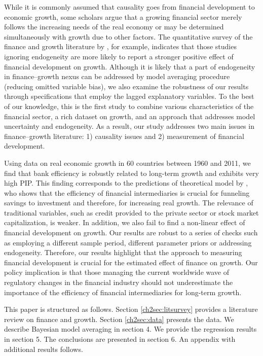 \begin{refsection}
While it is commonly assumed that causality goes from financial development to economic growth, some scholars argue that a growing financial sector merely follows the increasing needs of the real economy or may be determined simultaneously with growth due to other factors. The quantitative survey of the finance and growth literature by \textcite{Valickovaetal2014}, for example, indicates that those studies ignoring endogeneity are more likely to report a stronger positive effect of financial development on growth. Although it is likely that a part of endogeneity in finance--growth nexus can be addressed by model averaging procedure (reducing omitted variable bias), we also examine the robustness of our results through specifications that employ the lagged explanatory variables. To the best of our knowledge, this is the first study to combine various characteristics of the financial sector, a rich dataset on growth, and an approach that addresses model uncertainty and endogeneity. As a result, our study addresses two main issues in finance--growth literature: 1) causality issues and 2) measurement of financial development.

Using data on real economic growth in 60 countries between 1960 and 2011, we find that bank efficiency is robustly related to long-term growth and exhibits very high \ac{PIP}. This finding corresponds to the predictions of theoretical model by \textcite{Pagano1993}, who shows that the efficiency of financial intermediaries is crucial for funneling savings to investment and therefore, for increasing real growth. The relevance of traditional variables, such as credit provided to the private sector or stock market capitalization, is weaker. In addition, we also fail to find a non-linear effect of financial development on growth.  Our results are robust to a series of checks such as employing a different sample period, different parameter priors or addressing endogeneity. Therefore, our results highlight that the approach to measuring financial development is crucial for the estimated effect of finance on growth. Our policy implication is that those managing the current worldwide wave of regulatory changes in the financial industry should not underestimate the importance of the efficiency of financial intermediaries for long-term growth.

This paper is structured as follows. Section \ref{ch2sec:litsurvey} provides a literature review on finance and growth. Section \ref{ch2sec:data} presents the data. We describe Bayesian model averaging in section 4. We provide the regression results in section 5. The conclusions are presented in section 6. An appendix with additional results follows. 
%
%
% 
%
%

\end{refsection}
